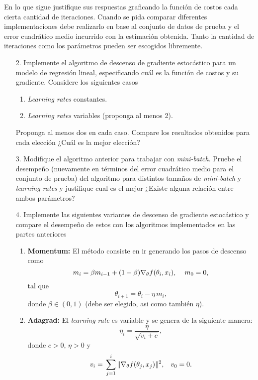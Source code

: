 \newp En lo que sigue justifique sus respuestas graficando la función de costos cada cierta cantidad de iteraciones. Cuando se pida comparar diferentes implementaciones debe realizarlo en base al conjunto de datos de prueba y el error cuadrático medio incurrido con la estimación obtenida. Tanto la cantidad de iteraciones como los parámetros pueden ser escogidos libremente.
\begin{enumerate}
  \item[2.] Implemente el algoritmo de descenso de gradiente estocástico para un modelo de regresión lineal, especificando cuál es la función de costos y su gradiente. Considere los siguientes casos
    \begin{enumerate}
      \item \emph{Learning rates} constantes.
      \item \emph{Learning rates} variables (proponga al menos 2).
    \end{enumerate}
    Proponga al menos dos en cada caso. Compare los resultados obtenidos para cada elección ¿Cuál es la mejor elección?
   
  \item[3.] Modifique el algoritmo anterior para trabajar con \emph{mini-batch}. Pruebe el desempeño (nuevamente en términos del error cuadrático medio para el conjunto de prueba) del algoritmo para distintos tamaños de \emph{mini-batch} y \emph{learning rates} y justifique cual es el mejor ¿Existe alguna relación entre ambos parámetros?
    
  \item[4.] Implemente las siguientes variantes de descenso de gradiente estocástico y compare el desempeño de estos con los algoritmos implementados en las partes anteriores
    \begin{enumerate}
        \item \textbf{Momentum:} El método consiste en ir generando los pasos de descenso como
          \[m_{i} = \beta m_{i-1} + (1-\beta)\nabla_{\theta}f(\theta_i,x_{i}),\hspace{0.4cm}m_0 = 0, \]
        tal que
        \[\theta_{i+1} = \theta_i -\eta\, m_i,\]
        donde $\beta\in(0,1)$ (debe ser elegido, asi como también $\eta$).
      \item \textbf{Adagrad:} El \emph{learning rate} es variable y se genera de la siguiente manera:
          \[\eta_{i} = \frac{\eta}{\sqrt{v_{i
          } + c}}, \]
        donde $c>0$, $\eta>0$ y 
        \begin{align*}
          v_{i} ={}& \sum_{j = 1}^{i}\|\nabla_{\theta}f(\theta_j,x_j)\|^2, \hspace{0.3cm}v_0 = 0.\\
        \end{align*}
    \end{enumerate}


\end{enumerate}
